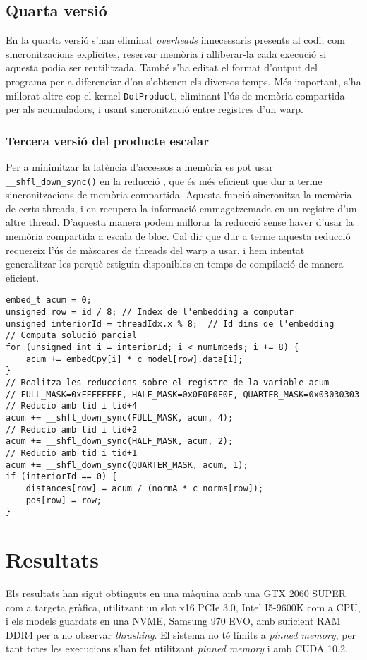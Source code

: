\documentclass[catalan,10pt,a4paper]{article}
\begin{document}
\subsection*{Quarta versió}
En la quarta versió s'han eliminat \textit{overheads} innecessaris presents al codi, com sincronitzacions explícites, reservar memòria i alliberar-la cada execució si aquesta podia ser reutilitzada. També s'ha editat el format d'output del programa per a diferenciar d'on s'obtenen els diversos temps.
Més important, s'ha millorat altre cop el kernel \verb|DotProduct|, eliminant l'ús de memòria compartida per als acumuladors, i usant sincronització entre registres d'un warp.
\subsubsection*{Tercera versió del producte escalar}
Per a minimitzar la latència d'accessos a memòria es pot usar \verb|__shfl_down_sync()| en la reducció \cite{UsingCUD95:online}, que és més eficient que dur a terme sincronitzacions de memòria compartida. Aquesta funció sincronitza la memòria de certs threads, i en recupera la informació emmagatzemada en un registre d'un altre thread. D'aquesta manera podem millorar la reducció sense haver d'usar la memòria compartida a escala de bloc.\newline
Cal dir que dur a terme aquesta reducció requereix l'ús de màscares de threads del warp a usar, i hem intentat generalitzar-les perquè estiguin disponibles en temps de compilació de manera eficient.
\begin{verbatim}
embed_t acum = 0;
unsigned row = id / 8; // Index de l'embedding a computar
unsigned interiorId = threadIdx.x % 8;  // Id dins de l'embedding
// Computa solució parcial
for (unsigned int i = interiorId; i < numEmbeds; i += 8) {
	acum += embedCpy[i] * c_model[row].data[i]; 
}
// Realitza les reduccions sobre el registre de la variable acum
// FULL_MASK=0xFFFFFFFF, HALF_MASK=0x0F0F0F0F, QUARTER_MASK=0x03030303
// Reducio amb tid i tid+4
acum += __shfl_down_sync(FULL_MASK, acum, 4); 
// Reducio amb tid i tid+2
acum += __shfl_down_sync(HALF_MASK, acum, 2);
// Reducio amb tid i tid+1
acum += __shfl_down_sync(QUARTER_MASK, acum, 1);
if (interiorId == 0) {
	distances[row] = acum / (normA * c_norms[row]);
	pos[row] = row;
}
\end{verbatim}
\section*{Resultats}\label{sec:results}
Els resultats han sigut obtinguts en una màquina amb una GTX 2060 SUPER com a targeta gràfica, utilitzant un slot x16 PCIe 3.0, Intel I5-9600K com a CPU, i els models guardats en una NVME, Samsung 970 EVO, amb suficient RAM DDR4 per a no observar \textit{thrashing}. El sistema no té límits a \textit{pinned memory}, per tant totes les execucions s'han fet utilitzant \textit{pinned memory} i amb CUDA 10.2.
\end{document}
